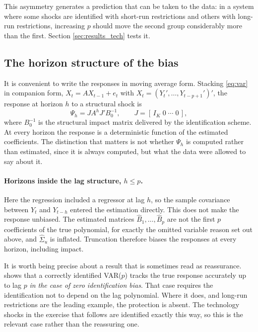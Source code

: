 This asymmetry generates a prediction that can be taken to the data: in a system where some
shocks are identified with short-run restrictions and others with long-run restrictions,
increasing $p$ should move the second group considerably more than the first. Section
\ref{sec:results_tech} tests it.

\subsection{The horizon structure of the bias}
\label{sec:horizons}

It is convenient to write the responses in moving average form. Stacking \eqref{eq:var} in
companion form, $X_t = A X_{t-1} + e_t$ with $X_t = (Y_t', \dots, Y_{t-p+1}')'$, the response
at horizon $h$ to a structural shock is
\begin{equation}
    \Psi_h = J A^{h} J' B_0^{-1}, \qquad J = [\,I_K \; 0 \; \cdots \; 0\,],
    \label{eq:companion}
\end{equation}
where $B_0^{-1}$ is the structural impact matrix delivered by the identification scheme. At
every horizon the response is a deterministic function of the estimated coefficients. The
distinction that matters is not whether $\Psi_h$ is computed rather than estimated, since it is
always computed, but what the data were allowed to say about it.

\paragraph{Horizons inside the lag structure, $h \leq p$.} Here the regression included a
regressor at lag $h$, so the sample covariance between $Y_t$ and $Y_{t-h}$ entered the
estimation directly. This does not make the response unbiased. The estimated matrices
$\hat{B}_1, \dots, \hat{B}_p$ are not the first $p$ coefficients of the true polynomial, for
exactly the omitted variable reason set out above, and $\hat{\Sigma}_u$ is inflated. Truncation
therefore biases the responses at every horizon, including impact.

It is worth being precise about a result that is sometimes read as reassurance.
\citet{Ravenna2007} shows that a correctly identified VAR($p$) tracks the true response
accurately up to lag $p$ \emph{in the case of zero identification bias}. That case requires the
identification not to depend on the lag polynomial. Where it does, and long-run restrictions
are the leading example, the protection is absent. The technology shocks in the exercise that
follows are identified exactly this way, so this is the relevant case rather than the
reassuring one.

